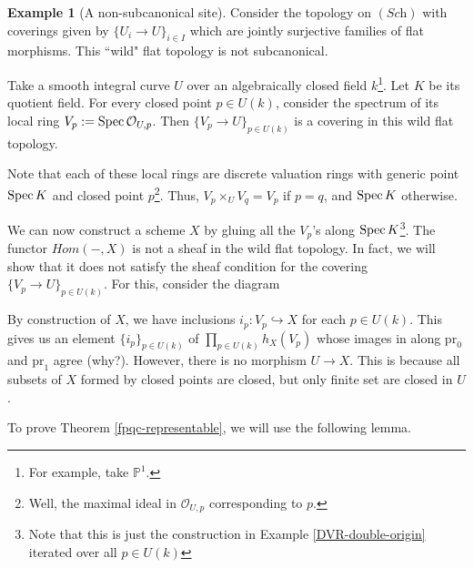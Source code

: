 \documentclass[11pt]{amsart}
\newcommand{\Spec}{{\rm Spec \,}}
\newcommand{\sO}{{\mathcal O}}
\renewcommand{\P}{{\mathbb P}}
\theoremstyle{definition}
\newtheorem{example}[theorem]{Example}
\begin{document}
\begin{example}[A non-subcanonical site]
	Consider the topology on $(\textit{Sch})$ with coverings given by $\{U_i \to U\}_{i \in I}$ which are jointly surjective families of flat morphisms. This ``wild" flat topology is not subcanonical.
	
	Take a smooth integral curve $U$ over an algebraically closed field $k$\footnote{For example, take $\P^1$.}. Let $K$ be its quotient field. For every closed point $p\in U(k)$, consider the spectrum of its local ring $V_p:=\Spec \sO_{U,p}$. Then $\{V_p \to U\}_{p \in U(k)}$ is a covering in this wild flat topology.
	
	Note that each of these local rings are discrete valuation rings with generic point $\Spec K$ and closed point $p$\footnote{Well, the maximal ideal in $\sO_{U,p}$ corresponding to $p$.}. Thus, $V_p\times_U V_q =V_p$ if $p=q$, and $\Spec K$ otherwise.
	
	We can now construct a scheme $X$ by gluing all the $V_p$'s along $\Spec K$\footnote{Note that this is just the construction in Example \ref{DVR-double-origin} iterated over all $p\in U(k)$}. The functor $\mathit{Hom}(-,X)$ is not a sheaf in the wild flat topology. In fact, we will show that it does not satisfy the sheaf condition for the covering $\{V_p \to U\}_{p \in U(k)}$. For this, consider the diagram
	\begin{center}
	\end{center}
	By construction of $X$, we have inclusions $i_p:V_p\hookrightarrow X$ for each $p\in U(k)$. This gives us an element $\{i_p\}_{p\in U(k)}$ of $\prod_{p\in U(k)} h_X(V_p)$ whose images in along $\text{pr}_0$ and $\text{pr}_1$ agree (why?). However, there is no morphism $U\rightarrow X$. This is because all subsets of $X$ formed by closed points are closed, but only finite set are closed in $U$.
	
\end{example}


To prove Theorem \ref{fpqc-representable}, we will use the following lemma.
\end{document}
